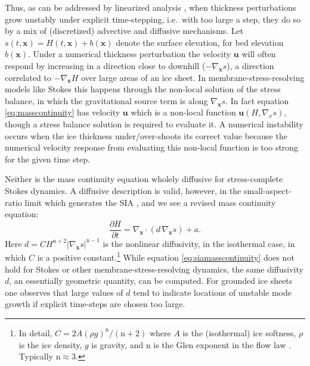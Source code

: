 \documentclass[twocolumn,letterpaper]{igs}
\newcommand\bu{\mathbf{u}}
\newcommand\bx{\mathbf{x}}
\newcommand{\grad}{\nabla}
\newcommand{\Divx}{\nabla_\bx \cdot}
\newcommand{\gradx}{\nabla_\bx}
\begin{document}
Thus, as can be addressed by linearized analysis \citep{Robinsonetal2022}, when thickness perturbations grow unstably under explicit time-stepping, i.e.~with too large a step, they do so by a mix of (discretized) advective and diffusive mechanisms.  Let $s(t,\bx)=H(t,\bx)+b(\bx)$ denote the surface elevation, for bed elevation $b(\bx)$.  Under a numerical thickness perturbation the velocity $\bu$ will often respond by increasing in a direction close to downhill ($-\gradx s$), a direction correlated to $-\gradx H$ over large areas of an ice sheet.  In membrane-stress-resolving models like Stokes this happens through the non-local solution of the stress balance, in which the gravitational source term is along $\gradx s$.  In fact equation \eqref{eq:masscontinuity} has velocity $\bu$ which is a non-local function $\bu(H,\grad_x s)$, though a stress balance solution is required to evaluate it.  A numerical instability occurs when the ice thickness under/over-shoots its correct value because the numerical velocity response from evaluating this non-local function is too strong for the given time step.

\newcommand{\nn}{\text{n}}
Neither is the mass continuity equation wholely diffusive for stress-complete Stokes dynamics.  A diffusive description is valid, however, in the small-aspect-ratio limit which generates the SIA \citep{SchoofHewitt2013}, and we see a revised mass continuity equation:
\begin{equation}
\frac{\partial H}{\partial t} = \Divx \left(d\, \gradx s \right) + a. \label{eq:siamasscontinuity}
\end{equation}
Here $d = C H^{\nn+2} |\gradx s|^{\nn-1}$ is the nonlinear diffusivity, in the isothermal case, in which $C$ is a positive constant.\footnote{In detail, $C = 2 A (\rho g)^\nn/(\nn+2)$ where $A$ is the (isothermal) ice softness, $\rho$ is the ice density, $g$ is gravity, and $\nn$ is the Glen exponent in the flow law \citep{GreveBlatter2009}.  Typically $\nn\approx 3$.}  While equation \eqref{eq:siamasscontinuity} does not hold for Stokes or other membrane-stress-resolving dynamics, the same diffusivity $d$, an essentially geometric quantity, can be computed.  For grounded ice sheets one observes that large values of $d$ tend to indicate locations of unstable mode growth if explicit time-steps are chosen too large.
\end{document}
